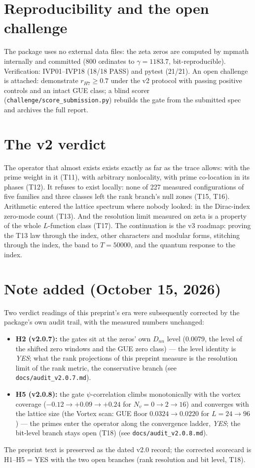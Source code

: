 \documentclass[11pt]{article}
\theoremstyle{definition}
\begin{document}
\section{Reproducibility and the open challenge}
The package uses no external data files: the zeta zeros are computed by
mpmath internally and committed (800 ordinates to $\gamma = 1183.7$,
bit-reproducible). Verification: IVP01--IVP18 (18/18 PASS) and pytest
(21/21). An open challenge is attached: demonstrate $r_{H7} \ge 0.7$
under the v2 protocol with passing positive controls and an intact GUE
class; a blind scorer (\texttt{challenge/score\_submission.py}) rebuilds
the gate from the submitted spec and archives the full report.

\section{The v2 verdict}
The operator that almost exists exists exactly as far as the trace
allows: with the prime weight in it (T11), with arbitrary nonlocality,
with prime co-location in its phases (T12). It refuses to exist locally:
none of 227 measured configurations of five families and three classes
left the rank branch's null zones (T15, T16). Arithmetic entered the lattice spectrum
where nobody looked: in the Dirac-index zero-mode count (T13). And the
resolution limit measured on zeta is a property of the whole $L$-function
class (T17). The continuation is the v3 roadmap: proving the T13 law through
the index, other characters and modular forms, stitching through the
index, the band to $T = 50000$, and the quantum response to the index.


\section*{Note added (October 15, 2026)}
Two verdict readings of this preprint's era were subsequently corrected by
the package's own audit trail, with the measured numbers unchanged:
\begin{itemize}
\item \textbf{H2 (v2.0.7):} the gates sit at the zeros' own $D_{nn}$ level
(0.0079, the level of the shifted zero windows and the GUE zero class) ---
the level identity is \emph{YES}; what the rank projections of this
preprint measure is the resolution limit of the rank metric, the
conservative branch (see \texttt{docs/audit\_v2.0.7.md}).
\item \textbf{H5 (v2.0.8):} the gate $\psi$-correlation climbs monotonically
with the vortex coverage ($-0.12 \to +0.09 \to +0.24$ for $N_v = 0 \to 2
\to 16$) and converges with the lattice size (the Vortex scan: GUE floor
$0.0324 \to 0.0220$ for $L = 24 \to 96$) --- the primes enter the operator
along the convergence ladder, \emph{YES}; the bit-level branch stays open
(T18) (see \texttt{docs/audit\_v2.0.8.md}).
\end{itemize}
The preprint text is preserved as the dated v2.0 record; the corrected
scorecard is H1--H5 = YES with the two open branches (rank resolution and
bit level, T18).
\end{document}
